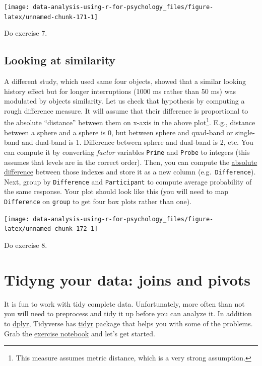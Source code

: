 \documentclass[
]{book}
\begin{document}
\begin{center}\texttt{[image: data-analysis-using-r-for-psychology\_files/figure-latex/unnamed-chunk-171-1]} \end{center}

Do exercise 7.

\hypertarget{looking-at-similarity}{%
\section{Looking at similarity}\label{looking-at-similarity}}

A different study, which used same four objects, showed that a similar looking history effect but for longer interruptions (1000 ms rather than 50 ms) was modulated by objects similarity. Let us check that hypothesis by computing a rough difference measure. It will assume that their difference is proportional to the absolute ``distance'' between them on x-axis in the above plot\footnote{This measure assumes metric distance, which is a very strong assumption.}. E.g., distance between a sphere and a sphere is 0, but between sphere and quad-band or single-band and dual-band is 1. Difference between sphere and dual-band is 2, etc. You can compute it by converting \emph{factor} variables \texttt{Prime} and \texttt{Probe} to integers (this assumes that levels are in the correct order). Then, you can compute the \href{https://stat.ethz.ch/R-manual/R-devel/library/base/html/MathFun.html}{absolute difference} between those indexes and store it as a new column (e.g.~\texttt{Difference}). Next, group by \texttt{Difference} and \texttt{Participant} to compute average probability of the same response. Your plot should look like this (you will need to map \texttt{Difference} on \texttt{group} to get four box plots rather than one).

\begin{center}\texttt{[image: data-analysis-using-r-for-psychology\_files/figure-latex/unnamed-chunk-172-1]} \end{center}

Do exercise 8.

\hypertarget{tyding}{%
\chapter{Tidyng your data: joins and pivots}\label{tyding}}

It is fun to work with tidy complete data. Unfortunately, more often than not you will need to preprocess and tidy it up before you can analyze it. In addition to \href{https://dplyr.tidyverse.org/}{dplyr}, Tidyverse has \href{https://tidyr.tidyverse.org/}{tidyr} package that helps you with some of the problems. Grab the \href{notebooks/Seminar\%2008\%20-\%20tidyr.Rmd}{exercise notebook} and let's get started.
\end{document}
